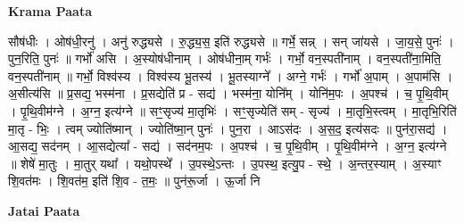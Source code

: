 \documentclass[17pt]{extarticle}
\begin{document}
\textbf{Krama Paata} \newline

सौष॑धीः । ओष॑धी॒रनु॑ । अनु॑ रुद्ध्यसे । रु॒द्ध्य॒स॒ इति॑ रुद्ध्यसे ॥ गर्भे॒ सन्न् । सन् जा॑यसे । जा॒य॒से॒ पुनः॑ । पुन॒रिति॒ पुनः॑ ॥ गर्भो॑ असि । अ॒स्योष॑धीनाम् । ओष॑धीना॒म् गर्भः॑ । गर्भो॒ वन॒स्पती॑नाम् । वन॒स्पती॑ना॒मिति॒ वन॒स्पती॑नाम् ॥ गर्भो॒ विश्व॑स्य । विश्व॑स्य भू॒तस्य॑ । भू॒तस्याग्ने᳚ । अग्ने॒ गर्भः॑ । गर्भो॑ अ॒पाम् । अ॒पाम॑सि । अ॒सीत्य॑सि ॥ प्र॒सद्य॒ भस्म॑ना । प्र॒सद्येति॑ प्र - सद्य॑ । भस्म॑ना॒ योनि᳚म् । योनि॑म॒पः । अ॒पश्च॑ । च॒ पृ॒थि॒वीम् । पृ॒थि॒वीम॑ग्ने । अ॒ग्न॒ इत्य॑ग्ने ॥ सꣳ॒॒सृज्य॑ मा॒तृभिः॑ । सꣳ॒॒सृज्येति॑ सम् - सृज्य॑ । मा॒तृभि॒स्त्वम् । मा॒तृभि॒रिति॑ मा॒तृ - भिः॒ । त्वम् ज्योति॑ष्मान् । ज्योति॑ष्मा॒न् पुनः॑ । पुन॒रा । आऽस॑दः । अ॒स॒द॒ इत्य॑सदः ॥ पुन॑रा॒सद्य॑ । आ॒सद्य॒ सद॑नम् । आ॒सद्येत्या᳚ - सद्य॑ । सद॑नम॒पः । अ॒पश्च॑ । च॒ पृ॒थि॒वीम् । पृ॒थि॒वीम॑ग्ने । अ॒ग्न॒ इत्य॑ग्ने ॥ शेषे॑ मा॒तुः । मा॒तुर् यथा᳚ । यथो॒पस्थे᳚ । उ॒पस्थे॒ऽन्तः । उ॒पस्थ॒ इत्यु॒प - स्थे॒ । अ॒न्तर॒स्याम् । अ॒स्याꣳ शि॒वत॑मः । शि॒वत॑म॒ इति॑ शि॒व - त॒मः॒ ॥ पुन॑रू॒र्जा । ऊ॒र्जा नि \newline

\textbf{Jatai Paata} \newline
\end{document}
